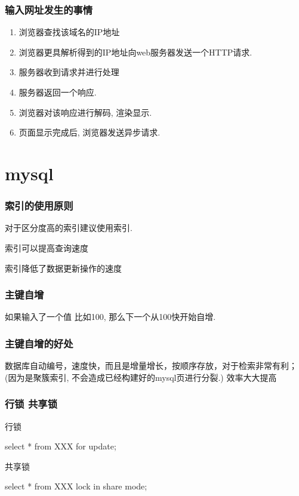 \documentclass[UTF8]{ctexart}
\begin{document}
\subsubsection{输入网址发生的事情}
\begin{enumerate}
	\item 浏览器查找该域名的IP地址
	\item 浏览器更具解析得到的IP地址向web服务器发送一个HTTP请求.
	\item 服务器收到请求并进行处理
	\item 服务器返回一个响应.
	\item 浏览器对该响应进行解码, 渲染显示.
	\item 页面显示完成后, 浏览器发送异步请求.
\end{enumerate}
\section{mysql}
\subsubsection{索引的使用原则}
对于区分度高的索引建议使用索引.

索引可以提高查询速度

索引降低了数据更新操作的速度

\subsubsection{主键自增}

如果输入了一个值 比如100, 那么下一个从100快开始自增.

\subsubsection{主键自增的好处}
数据库自动编号，速度快，而且是增量增长，按顺序存放，对于检索非常有利；(因为是聚簇索引, 不会造成已经构建好的mysql页进行分裂.) 效率大大提高
\subsubsection{行锁 共享锁}
行锁

select * from XXX  for update;

共享锁

select * from XXX lock in share mode;
\end{document}
